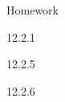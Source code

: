 \begin{frame}{Homework}
  \begin{center}

    12.2.1

  \vspace{2em}

  12.2.5

  \vspace{2em}

  12.2.6

  \end{center}
\end{frame}








